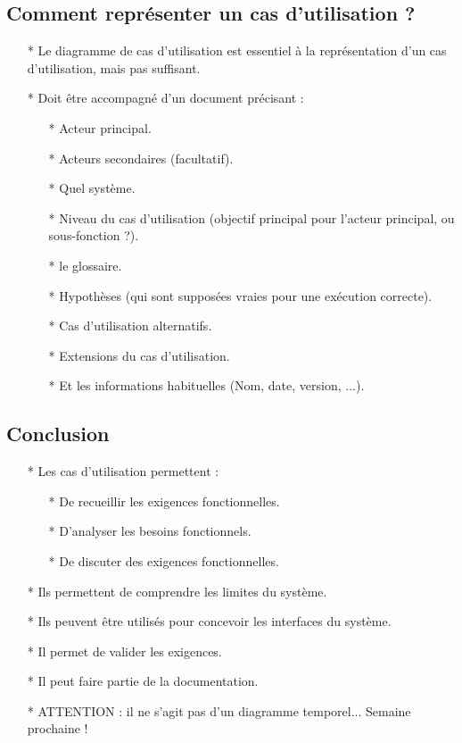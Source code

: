 \documentclass[12pt]{article}
\begin{document}
\subsection{Comment représenter un cas d'utilisation ?}
\begin{itemize}
	\item [*] Le diagramme de cas d'utilisation est essentiel à la représentation d'un cas d'utilisation, mais pas suffisant.
	\item[*] Doit être accompagné d'un document précisant :
	\begin{itemize}
		\item[*] Acteur principal.
		\item [*] Acteurs secondaires (facultatif).
		\item[*] Quel système.
		\item[*] Niveau du cas d'utilisation (objectif principal pour l'acteur principal, ou sous-fonction ?).
		\item [*] le glossaire.
		\item [*] Hypothèses (qui sont supposées vraies pour une exécution correcte).
		\item [*] Cas d'utilisation alternatifs.
		\item[*] Extensions du cas d'utilisation.
		\item[*] Et les informations habituelles (Nom, date, version, ...).
	\end{itemize}
\end{itemize}
\subsection{Conclusion}
\begin{itemize}
	\item [*] Les cas d'utilisation permettent :
	\begin{itemize}
		\item[*] De recueillir les exigences fonctionnelles.
		\item [*] D'analyser les besoins fonctionnels.
		\item[*] De discuter des exigences fonctionnelles.
		
	\end{itemize}
\item[*]  Ils permettent de comprendre les limites du système.
\item [*] Ils peuvent être utilisés pour concevoir les interfaces du système.
\item[*] Il permet de valider les exigences.
\item[*] Il peut faire partie de la documentation.
\item[*] ATTENTION : il ne s'agit pas d'un diagramme temporel... Semaine prochaine !
\end{itemize}
\end{document}
